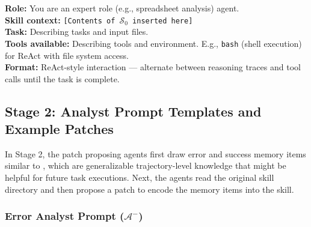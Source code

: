 \begin{tcolorbox}[
    title={\textbf{Stage 1 — Agent System Prompt (abbreviated)}},
    colback=gray!5, colframe=gray!50, fonttitle=\small\bfseries,
    breakable, left=4pt, right=4pt, top=4pt, bottom=4pt
]
\small
\textbf{Role:} You are an expert {role} (e.g., spreadsheet analysis) agent. \\[2pt]
\textbf{Skill context:} \texttt{[Contents of \(\mathcal{S}_0\) inserted here]} \\[2pt]
\textbf{Task:} Describing tasks and input files. \\[2pt]
\textbf{Tools available:} Describing tools and environment. E.g., \texttt{bash} (shell execution) for ReAct with file system access. \\[2pt]
\textbf{Format:} ReAct-style interaction --- alternate between reasoning traces
and tool calls until the task is complete.
\end{tcolorbox}

\subsection{Stage 2: Analyst Prompt Templates and Example Patches}
\label{app:stage2_prompts}

In Stage 2, the patch proposing agents first draw error and success memory items similar to \citep{ouyang2026reasoningbankscalingagentselfevolving}, which are generalizable trajectory-level knowledge that might be helpful for future task executions. Next, the agents read the original skill directory and then propose a patch to encode the memory items into the skill.

\subsubsection{Error Analyst Prompt ($\mathcal{A}^-$)}

